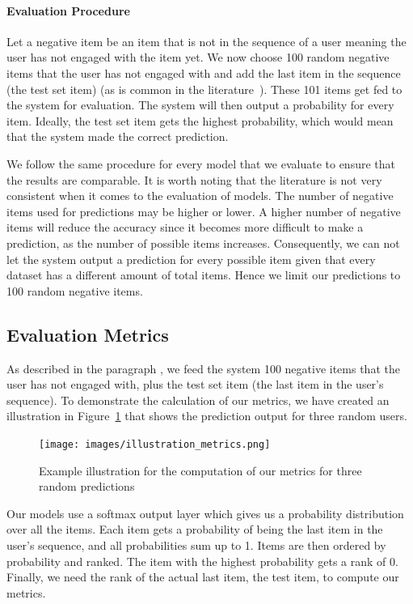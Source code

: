\paragraph{Evaluation Procedure}
\label{paragraph:test_procedure}
Let a negative item be an item that is not in the sequence of a user meaning the user has not engaged with the item yet. We now choose 100 random negative items that the user has not engaged with and
add the last item in the sequence (the test set item) (as is common in the literature~\cite{ying2018graph}). These 101 items get fed to the system for evaluation. The system will then output a probability for every item. Ideally, the test set item gets the highest probability, which would mean that the system made the correct prediction.

We follow the same procedure for every model that we evaluate to ensure that the results are comparable. It is worth noting that the literature is not very consistent when it comes to the evaluation of models. The number of negative items used for predictions may be higher or lower. A higher number of negative items will reduce the accuracy since it becomes more difficult to make a prediction, as the number of possible items increases. Consequently, we can not let the system output a prediction for every possible item given that every dataset has a different amount of total items. Hence we limit our predictions to 100 random negative items.


\subsection{Evaluation Metrics}\label{sec:metrics}

As described in the paragraph , we feed the system 100 negative items that the user has not engaged with, plus the test set item (the last item in the user’s sequence). To demonstrate the calculation of our metrics, we have created an illustration in Figure~\ref{fig:illustration_metrics} that shows the prediction output for three random users.

\begin{figure}[htbp]
\centering
\texttt{[image: images/illustration\_metrics.png]}
\caption{Example illustration for the computation of our metrics for three random predictions}
\label{fig:illustration_metrics}
\end{figure}

Our models use a softmax output layer which gives us a probability distribution over all the items. Each item gets a probability of being the last item in the user's sequence, and all probabilities sum up to 1. Items are then ordered by probability and ranked. The item with the highest probability gets a rank of 0. Finally, we need the rank of the actual last item, the test item, to compute our metrics.


